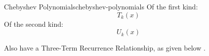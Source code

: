\begin{definition}{Chebyshev Polynomials}{chebyshev-polynomials}
  Of the first kind: $$T_k(x)$$ Of the second kind: $$U_k(x)$$
\end{definition}
Also have a Three-Term Recurrence Relationship, as given below .
